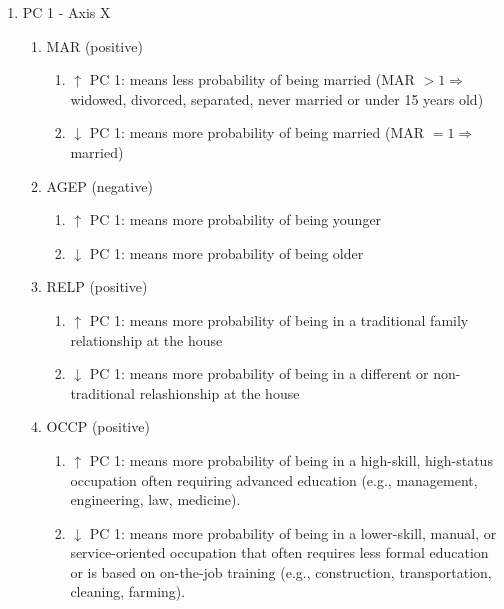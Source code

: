\begin{enumerate}
    \item PC 1 - Axis X
    \begin{enumerate}
        \item MAR (positive)
        \begin{enumerate}
            \item $\uparrow$ PC 1: means less probability of being married (MAR $> 1 \Rightarrow $ widowed, divorced, separated, never married or under 15 years old)
            \item $\downarrow$ PC 1: means more probability of being married (MAR $= 1 \Rightarrow $ married)
        \end{enumerate}

        \item AGEP (negative)
        \begin{enumerate}
            \item $\uparrow$ PC 1: means more probability of being younger
            \item $\downarrow$ PC 1: means more probability of being older
        \end{enumerate}

        \item RELP (positive)
        \begin{enumerate}
            \item $\uparrow$ PC 1: means more probability of being in a traditional family relationship at the house
            \item $\downarrow$ PC 1: means more probability of being in a different or non-traditional relashionship at the house
        \end{enumerate}

        \item OCCP (positive)
        \begin{enumerate}
            \item $\uparrow$ PC 1: means more probability of being in a high-skill, high-status occupation often requiring advanced education (e.g., management, engineering, law, medicine).
            \item $\downarrow$ PC 1: means more probability of being in a  lower-skill, manual, or service-oriented occupation that often requires less formal education or is based on on-the-job training (e.g., construction, transportation, cleaning, farming). 
        \end{enumerate}
    \end{enumerate}


\end{enumerate}
